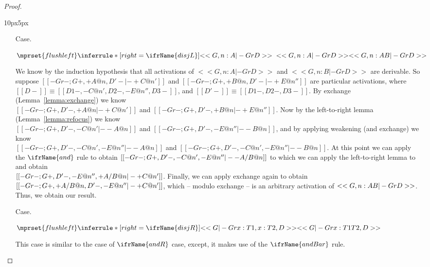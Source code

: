 \begin{proof}
\begin{changemargin}{10px}{5px}
\begin{itemize}
  \item[Case.]\ \\ 
    \begin{center}
      \begin{math}
        $$\mprset{flushleft}
        \inferrule* [right=\ifrName{disjL}] {
          <<G, n : A |- Gr D>>
          \\\\
          <<G, n : A |- Gr D>>
        }{<<G, n : A \/ B |- Gr D>>}
      \end{math}
    \end{center}
    We know by the induction hypothesis that all activations of $<<G, n : A |- Gr D>>$ and
    $<<G, n : B |- Gr D>>$ are derivable.  So suppose $[[-Gr-; {G}+,+{A}@n,{D'}- |- + C @ n']]$ and
    $[[-Gr-; {G}+,+{B}@n,{D'}- |- + E @ n'']]$ are particular activations, 
    where $[[{D}-]] \equiv [[{D1}-,-C@n',{D2}-,-E@n'',{D3}-]]$, and $[[{D'}-]] \equiv [[{D1}-,{D2}-,{D3}-]]$.
    By exchange (Lemma~\ref{lemma:exchange}) we know \\
    $[[-Gr-; {G}+,{D'}-,+{A}@n |- + C @ n']]$ 
    and  $[[-Gr-; {G}+,{D'}-,+{B}@n |- + E @ n'']]$.  Now by the left-to-right lemma (Lemma~\ref{lemma:refocus}) we know \\
    $[[-Gr-; {G}+,{D'}-, - C @ n' |- -{A}@n]]$ and $[[-Gr-; {G}+,{D'}-, - E @ n'' |- -{B}@n]]$, and by applying
    weakening (and exchange) we know \\ $[[-Gr-; {G}+,{D'}-, - C @ n', - E @ n'' |- -{A}@n]]$ and 
    $[[-Gr-; {G}+,{D'}-, -C@n',- E @ n'' |- -{B}@n]]$.  At this point we can apply 
    the $\ifrName{\normalsize and}$ rule to obtain $[[-Gr-; {G}+,{D'}-, - C @ n',- E @ n'' |- - {A} /\- {B} @ n]]$ to which we can apply
    the left-to-right lemma to and obtain \\
    $[[-Gr-; {G}+,{D'}-,- E @ n'',+ {A} /\- {B} @ n |- + C @ n']]$.  Finally, we can apply 
    exchange again to obtain $[[-Gr-; {G}+, + {A} /\- {B} @ n, {D'}-,- E @ n'' |- + C @ n']]$, which -- modulo exchange -- is
    an arbitrary activation of $<<G, n : A \/ B |- Gr D>>$.   Thus, we obtain our result.
    

  \item[Case.]\ \\ 
    \begin{center}
      \begin{math}
        $$\mprset{flushleft}
        \inferrule* [right=\ifrName{disjR}] {
          <<G |- Gr x : T1, x : T2, D>>
        }{<<G |- Gr x : T1 \/ T2, D>>}
      \end{math}
    \end{center}
    This case is similar to the case of $\ifrName{\normalsize andR}$ case, except,
    it makes use of the $\ifrName{\normalsize andBar}$ rule.


\end{itemize}
\end{changemargin}
\end{proof}
